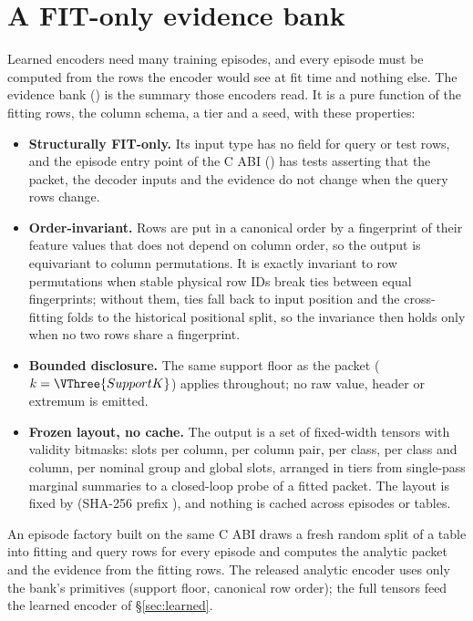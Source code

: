 \section{A FIT-only evidence bank}\label{sec:evidence}

Learned encoders need many training episodes, and every episode must be computed from the rows the encoder would see at fit time and nothing else.
The evidence bank () is the summary those encoders read.
It is a pure function of the fitting rows, the column schema, a tier and a seed, with these properties:
\begin{itemize}
  \item \textbf{Structurally FIT-only.} Its input type has no field for query or test rows, and the episode entry point of the C ABI () has tests asserting that the packet, the decoder inputs and the evidence do not change when the query rows change.
  \item \textbf{Order-invariant.} Rows are put in a canonical order by a fingerprint of their feature values that does not depend on column order, so the output is equivariant to column permutations. It is exactly invariant to row permutations when stable physical row IDs break ties between equal fingerprints; without them, ties fall back to input position and the cross-fitting folds to the historical positional split, so the invariance then holds only when no two rows share a fingerprint.
  \item \textbf{Bounded disclosure.} The same support floor as the packet ($k=\VThree{SupportK}$) applies throughout; no raw value, header or extremum is emitted.
  \item \textbf{Frozen layout, no cache.} The output is a set of fixed-width tensors with validity bitmasks:  slots per column,  per column pair,  per class,  per class and column,  per nominal group and  global slots, arranged in  tiers from single-pass marginal summaries to a closed-loop probe of a fitted packet. The layout is fixed by  (SHA-256 prefix \texttt{}), and nothing is cached across episodes or tables.
\end{itemize}
An episode factory built on the same C ABI draws a fresh random split of a table into fitting and query rows for every episode and computes the analytic packet and the evidence from the fitting rows.
The released analytic encoder uses only the bank's primitives (support floor, canonical row order); the full tensors feed the learned encoder of \S\ref{sec:learned}.
